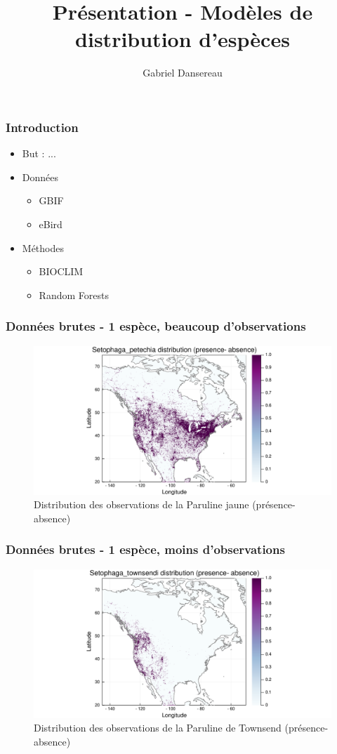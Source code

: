 \documentclass[10pt]{beamer}
\title{Présentation - Modèles de distribution d'espèces}
\author{Gabriel Dansereau}
\begin{document}
\begin{frame}
  \titlepage
\end{frame}

\begin{frame}
  \frametitle{Introduction}
  \begin{itemize}
    \item But : ...
    \item Données
    \begin{itemize}
      \item GBIF
      \item eBird
    \end{itemize}
    \item Méthodes
    \begin{itemize}
      \item BIOCLIM
      \item Random Forests
    \end{itemize}
  \end{itemize}
\end{frame}

\begin{frame}
  \frametitle{Données brutes - 1 espèce, beaucoup d'observations}
  \begin{figure}
    \centering
    \includegraphics[scale=0.4]{fig/raw-sp-Setophaga_petechia.pdf}
    \caption{Distribution des observations de la Paruline jaune (présence-absence)}
  \end{figure}
\end{frame}

\begin{frame}
  \frametitle{Données brutes - 1 espèce, moins d'observations}
  \begin{figure}
    \centering
    \includegraphics[scale=0.4]{fig/raw-sp-Setophaga_townsendi.pdf}
    \caption{Distribution des observations de la Paruline de Townsend (présence-absence)}
  \end{figure}
\end{frame}
\end{document}
